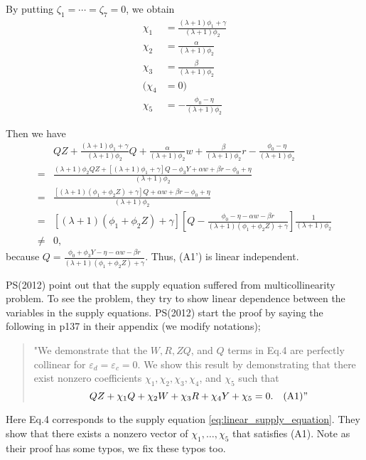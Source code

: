 \documentclass[11pt, a4paper]{article}
\begin{document}
By putting $\zeta_1 = \cdots = \zeta_7 =0$, we obtain 
\begin{align*}
        \chi_1 &= \frac{(\lambda + 1)\phi_1 + \gamma}{(\lambda + 1)\phi_2}\\
        \chi_2 &= \frac{\alpha}{(\lambda + 1)\phi_2}\\
        \chi_3 &= \frac{\beta}{(\lambda + 1)\phi_2}\\
        (\chi_4 &= 0)\\
        \chi_5 &= -\frac{\phi_0 - \eta}{(\lambda + 1)\phi_2}
\end{align*}

Then we have
\begin{align*}
    &QZ + \frac{(\lambda + 1)\phi_1 + \gamma}{(\lambda + 1)\phi_2}Q +  \frac{\alpha}{(\lambda + 1)\phi_2} w +  \frac{\beta}{(\lambda + 1)\phi_2}r -\frac{\phi_0 - \eta}{(\lambda + 1)\phi_2} \\
    =&\frac{ (\lambda + 1)\phi_2QZ + [(\lambda + 1)\phi_1 + \gamma]Q  -\phi_3 Y + \alpha w + \beta r - \phi_0 + \eta}{(\lambda + 1)\phi_2}\\
    =& \frac{[(\lambda + 1)(\phi_1 + \phi_2 Z) + \gamma]Q  + \alpha w + \beta r - \phi_0 + \eta}{(\lambda + 1)\phi_2}\\
    =& [(\lambda + 1)(\phi_1 + \phi_2 Z) + \gamma]\left[ Q - \frac{\phi_0 - \eta- \alpha w - \beta r}{(\lambda + 1)(\phi_1 + \phi_2 Z) + \gamma}\right]\frac{1}{(\lambda + 1)\phi_2}\\
    \neq& 0,
\end{align*}
because $Q = \frac{\phi_0 + \phi_3Y -\eta - \alpha w -  \beta r}{(\lambda + 1) (\phi_1 + \phi_2 Z) + \gamma}$. 
Thus, (A1') is linear independent.


\newpage

PS(2012) point out that the supply equation suffered from multicollinearity problem.
To see the problem, they try to show linear dependence between the variables in the supply equations. 
PS(2012) start the proof by saying the following in p137 in their appendix (we modify notations);
\begin{quote}
    "We demonstrate that the $W, R, ZQ$, and $Q$ terms in Eq.4 are perfectly collinear for $\varepsilon_d = \varepsilon_c = 0$. We show this result by demonstrating that there exist nonzero coefficients $\chi_1,\chi_2,\chi_3,\chi_4$, and $\chi_5$ such that 
    \[QZ + \chi_1 Q + \chi_2 W + \chi_3 R + \chi_4 Y + \chi_5 = 0.\quad \text{(A1)}"\]
\end{quote}
Here Eq.4 corresponds to the supply equation \eqref{eq:linear_supply_equation}.
They show that there exists a nonzero vector of $\chi_1, \ldots, \chi_5$ that satisfies (A1).
Note as their proof has some typos, we fix these typos too.
\end{document}
